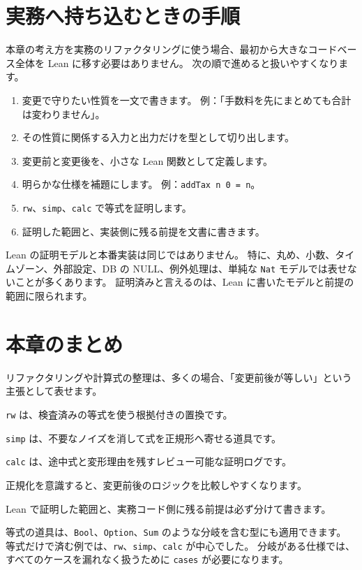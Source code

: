\section{実務へ持ち込むときの手順}

本章の考え方を実務のリファクタリングに使う場合、最初から大きなコードベース全体を Lean に移す必要はありません。
次の順で進めると扱いやすくなります。

\begin{enumerate}
\item 変更で守りたい性質を一文で書きます。
例：「手数料を先にまとめても合計は変わりません」。
\item その性質に関係する入力と出力だけを型として切り出します。
\item 変更前と変更後を、小さな Lean 関数として定義します。
\item 明らかな仕様を補題にします。
例：\texttt{addTax n 0 = n}。
\item \texttt{rw}、\texttt{simp}、\texttt{calc} で等式を証明します。
\item 証明した範囲と、実装側に残る前提を文書に書きます。
\end{enumerate}

Lean の証明モデルと本番実装は同じではありません。
特に、丸め、小数、タイムゾーン、外部設定、DB の NULL、例外処理は、単純な \texttt{Nat} モデルでは表せないことが多くあります。
証明済みと言えるのは、Lean に書いたモデルと前提の範囲に限られます。

\section{本章のまとめ}

リファクタリングや計算式の整理は、多くの場合、「変更前後が等しい」という主張として表せます。

\texttt{rw} は、検査済みの等式を使う根拠付きの置換です。

\texttt{simp} は、不要なノイズを消して式を正規形へ寄せる道具です。

\texttt{calc} は、途中式と変形理由を残すレビュー可能な証明ログです。

正規化を意識すると、変更前後のロジックを比較しやすくなります。

Lean で証明した範囲と、実務コード側に残る前提は必ず分けて書きます。

等式の道具は、\texttt{Bool}、\texttt{Option}、\texttt{Sum} のような分岐を含む型にも適用できます。
等式だけで済む例では、\texttt{rw}、\texttt{simp}、\texttt{calc} が中心でした。
分岐がある仕様では、すべてのケースを漏れなく扱うために \texttt{cases} が必要になります。
